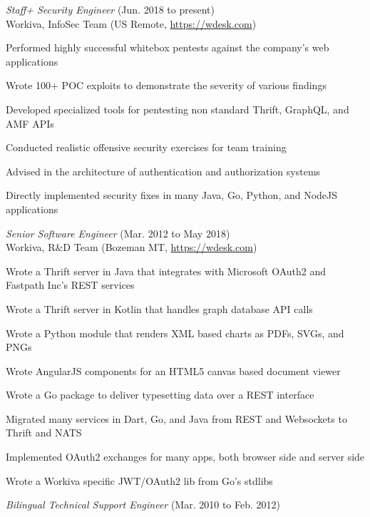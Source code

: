 \documentclass[10pt, a4paper]{article}
\begin{document}
\begin{itemize*}
  \item \emph{Staff+ Security Engineer} (Jun. 2018 to present)\\
    Workiva, InfoSec Team (US Remote, \url{https://wdesk.com})
    \begin{itemize*}
    \item Performed highly successful whitebox pentests against the company's web applications
    \item Wrote 100+ POC exploits to demonstrate the severity of various findings
    \item Developed specialized tools for pentesting non standard Thrift, GraphQL, and AMF APIs
    \item Conducted realistic offensive security exercises for team training
    \item Advised in the architecture of authentication and authorization systems
    \item Directly implemented security fixes in many Java, Go, Python, and NodeJS applications
    \end{itemize*}
  \item \emph{Senior Software Engineer} (Mar. 2012 to May 2018)\\
    Workiva, R\&D Team (Bozeman MT, \url{https://wdesk.com})
    \begin{itemize*}
    \item Wrote a Thrift server in Java that integrates with Microsoft OAuth2 and Fastpath Inc's REST services
    \item Wrote a Thrift server in Kotlin that handles graph database API calls
    \item Wrote a Python module that renders XML based charts as PDFs, SVGs, and PNGs
    \item Wrote AngularJS components for an HTML5 canvas based document viewer
    \item Wrote a Go package to deliver typesetting data over a REST interface
    \item Migrated many services in Dart, Go, and Java from REST and Websockets to Thrift and NATS
    \item Implemented OAuth2 exchanges for many apps, both browser side and server side
    \item Wrote a Workiva specific JWT/OAuth2 lib from Go's stdlibs
    \end{itemize*}
  \item \emph{Bilingual Technical Support Engineer} (Mar. 2010 to Feb. 2012)\\

\end{itemize*}
\end{document}
